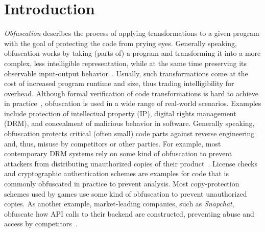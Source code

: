 \documentclass[letterpaper,twocolumn,10pt]{article}
\theoremstyle{customexample}
\theoremstyle{customexperiment}
\begin{document}
 \section{Introduction}\label{sec:intro}

\emph{Obfuscation} describes the process of applying transformations to a given program with the goal of protecting the code from prying eyes. Generally speaking, obfuscation works by taking (parts of) a program and transforming it into a more complex, less intelligible representation, while at the same time preserving its observable input-output behavior~\cite{collberg1997taxonomy}. Usually, such transformations come at the cost of increased program runtime and size, thus trading intelligibility for overhead. Although formal verification of code transformations is hard to achieve in practice~\cite{lu2020formal,yang2011finding}, obfuscation is used in a wide range of real-world scenarios. Examples include protection of intellectual property (IP), digital rights management (DRM), and concealment of malicious behavior in software. Generally speaking, obfuscation protects critical (often small) code parts against reverse engineering and, thus, misuse by competitors or other parties. For example, most contemporary DRM systems rely on some kind of obfuscation to prevent attackers from distributing unauthorized copies of their product~\cite{nakanishi2020intertwining}. License checks and cryptographic authentication schemes are examples for code that is commonly obfuscated in practice to prevent analysis. Most copy-protection schemes used by games use some kind of obfuscation to prevent unauthorized copies. As another example, market-leading companies, such as \emph{Snapchat}, obfuscate how API calls to their backend are constructed, preventing abuse and access by competitors~\cite{snapchat_obfuscation}. 
\end{document}
